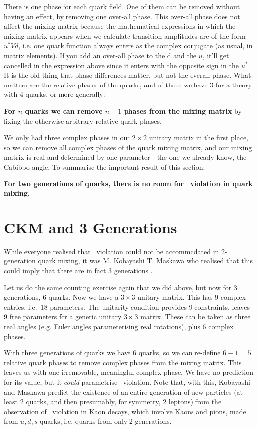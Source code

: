  There is one phase for each quark field. One of them can be removed
 without having an effect, by removing one over-all phase. This
 over-all phase does not affect the mixing matrix because the
 mathematical expressions in which the mixing matrix appears when we
 calculate transition amplitudes are of the form $u^* V d$, i.e. one
 quark function always enters as the complex conjugate (as usual, in
 matrix elements). If you add an over-all phase to the d and the $u$,
 it'll get cancelled in the expression above since it enters with the
 opposite sign in the $u^*$. It is the old thing that phase
 differences matter, but not the overall phase. What matters are the
 relative phases of the quarks, and of those we have $3$ for a theory
 with 4 quarks, or more generally:

 \textbf{For $n$ quarks we can remove $n-1$ phases from the mixing
 matrix} by fixing the otherwise arbitrary relative quark phases.

 We only had three complex phases in our $2\times 2$ unitary matrix in
 the first place, so we can remove all complex phases of the quark
 mixing matrix, and our mixing matrix is real and determined by one
 parameter - the one we already know, the Cabibbo angle. To summarise
 the important result of this section:

\textbf{For two generations of quarks, there is no room for \cp\
 violation in quark mixing.}

\section{CKM and 3 Generations}

 While everyone realised that \cp\ violation could not be accommodated
 in 2-generation quark mixing, it was M. Kobayashi T. Maskawa who
 realised that this could imply that there are in fact 3 generations
 \cite{progtp.km}.

 Let us do the same counting exercise again that we did above, but now
 for 3 generations, 6 quarks. Now we have a $3\times 3$ unitary
 matrix. This has 9 complex entries, i.e.~18 parameters. The unitarity
 condition provides 9 constraints, leaves 9 free parameters for a
 generic unitary $3\times 3$ matrix. These can be taken as three real
 angles (e.g. Euler angles parameterising real rotations), plus 6
 complex phases.

 With three generations of quarks we have 6 quarks, so we can
 re-define $6-1=5$ relative quark phases to remove complex phases from
 the mixing matrix.
%
 This leaves us with one irremovable, meaningful complex phase. We have
 no prediction for its value, but it \emph{could} parametrise \cp\
 violation. 
%
 Note that, with this, Kobayashi and Maskawa predict the existence of
 an entire generation of new particles (at least 2 quarks, and then
 presumably, for symmetry, 2 leptons) from the observation of \cp\
 violation in Kaon decays, which involve Kaons and pions, made from
 $u,d,s$ quarks, i.e. quarks from only 2-generations.

